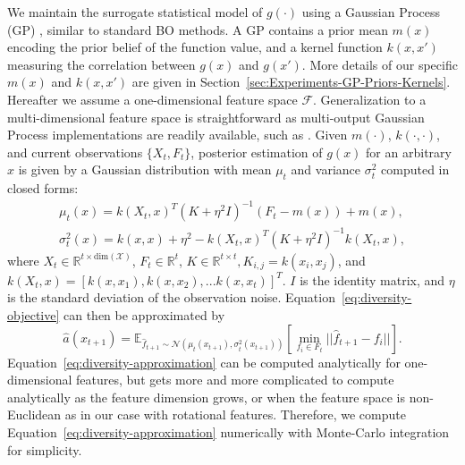 We maintain the surrogate statistical model of $g(\cdot)$ using a Gaussian Process (GP) \cite{rasmussen2003gaussian-process}, similar to standard BO methods. A GP contains a prior mean $m(x)$ encoding the prior belief of the function value, and a kernel function $k(x,x')$ measuring the correlation between $g(x)$ and $g(x')$. More details of our specific $m(x)$ and $k(x,x')$ are given in Section~\ref{sec:Experiments-GP-Priors-Kernels}. Hereafter we assume a one-dimensional feature space $\mathcal{F}$. Generalization to a multi-dimensional feature space is straightforward as multi-output Gaussian Process implementations are readily available, such as \cite{GPflow2020multioutput-gp}. Given $m(\cdot)$, $k(\cdot, \cdot)$, and current observations $\{X_t, F_t\}$, posterior estimation of $g(x)$ for an arbitrary $x$ is given by a Gaussian distribution with mean $\mu_{t}$ and variance $\sigma^2_{t}$ computed in closed forms:
\begin{equation}\label{eq:gp-mu-sigma}
    \begin{gathered}
        \mu_{t}(x) = k(X_t, x)^T (K + \eta^{2} I)^{-1} \left(F_t - m(x)\right) + m(x), \\
        \sigma_{t}^{2}(x) = k(x, x) + \eta^{2} - k(X_t, x)^T(K + \eta^{2}I)^{-1} k(X_t,x) ,
    \end{gathered}
\end{equation}
where $X_t \in \mathbb{R}^{t \times \text{dim}(\mathcal{X})}$, $F_t \in \mathbb{R}^{t}$, $K \in \mathbb{R}^{t \times t}, K_{i,j} = k(x_{i}, x_{j})$, and $k(X_t, x) = [k(x,x_{1}),k(x,x_{2}),...k(x,x_{t})]^T$. $I$ is the identity matrix, and $\eta$ is the standard deviation of the observation noise. Equation~\ref{eq:diversity-objective} can then be approximated by
\begin{equation}\label{eq:diversity-approximation}
    \hat{a}(x_{t+1}) = \mathbb{E}_{\hat{f}_{t+1} \sim \mathcal{N}(\mu_t(x_{t+1}), \sigma^2_t(x_{t+1}))}\left[\min_{f_i \in F_t}{||\hat{f}_{t+1} - f_i||}\right] .
\end{equation}
Equation~\ref{eq:diversity-approximation} can be computed analytically for one-dimensional features, but gets more and more complicated to compute analytically as the feature dimension grows, or when the feature space is non-Euclidean as in our case with rotational features. Therefore, we compute Equation~\ref{eq:diversity-approximation} numerically with Monte-Carlo integration for simplicity.

